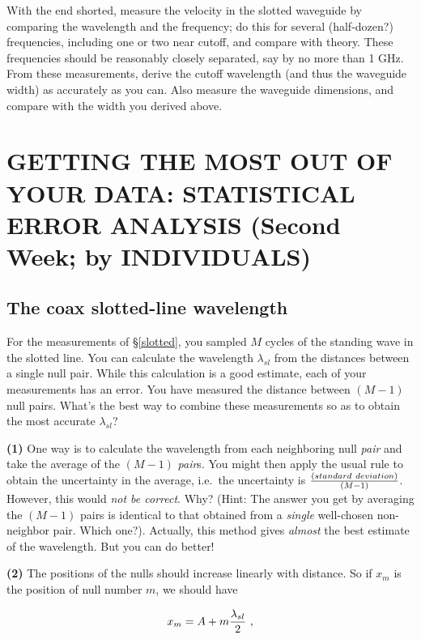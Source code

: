 \documentclass[12pt,preprint]{aastex}
\begin{document}
With the end shorted, measure the velocity in the slotted waveguide by
comparing the wavelength and the frequency; do this for several
(half-dozen?) frequencies, including one or two near cutoff, and compare
with theory.  These frequencies should be reasonably closely separated,
say by no more than 1 GHz.  From these measurements, derive the cutoff
wavelength (and thus the waveguide width) as accurately as you can.
Also measure the waveguide dimensions, and compare 
with the width you derived above.

\section {GETTING THE MOST OUT OF YOUR DATA: STATISTICAL ERROR
ANALYSIS (Second Week; by INDIVIDUALS)} \label{secondweek}

\subsection{The coax slotted-line wavelength} \label{lbandcoax} 
\label{slottedls}

	For the measurements of \S \ref{slotted}, you sampled $M$
        cycles of the standing wave in the slotted line. You can
        calculate the wavelength $\lambda_{sl}$ from the distances
        between a single null pair. While this calculation is a good
        estimate, each of your measurements has an error. You have
        measured the distance between $(M-1)$ null pairs. What's the
        best way to combine these measurements so as to obtain the most
        accurate $\lambda_{sl}$?

{\bf (1)} One way is to calculate the wavelength from each neighboring
null {\it pair} and take the average of the $(M-1)$ {\it pair}s.  You
might then apply the usual rule to obtain the uncertainty in the
average, i.e.\ the uncertainty is $(standard \ deviation) \over (M-1)$.
However, this would {\it not be correct}.  Why? (Hint: The answer you
get by averaging the $(M-1)$ pairs is identical to that obtained from a
{\it single} well-chosen non-neighbor pair.  Which one?).  Actually,
this method gives {\it almost} the best estimate of the wavelength.  But
you can do better!

	{\bf (2)} The positions of the nulls should increase linearly
with distance. So if $x_{m}$ is the position of null number $m$, we
should have

\begin{equation}
x_m = A + m {\lambda_{sl} \over 2} \ ,
\end{equation}
\end{document}

